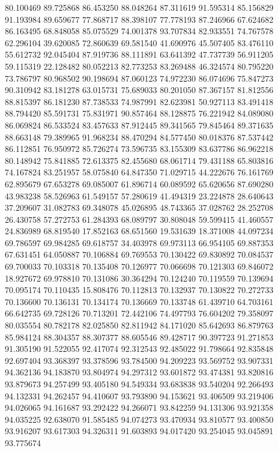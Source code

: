 80.100469
89.725868
86.453250
88.048264
87.311619
91.595314
85.156829
91.193984
89.659677
77.868717
88.398107
77.778193
87.246966
67.624682
86.163495
68.848058
85.075529
74.001378
93.707834
82.933551
74.767578
62.296104
39.620085
72.860639
69.581540
41.690976
45.507405
83.476110
55.612732
92.045404
87.919736
88.111891
63.641392
47.737739
56.911205
59.115319
22.128482
80.052213
82.773253
83.269488
46.324574
80.795220
73.786797
80.968502
90.198694
87.060123
74.972230
86.074696
75.847273
90.310942
83.181278
63.015731
75.689033
80.201050
87.367157
81.812556
88.815397
86.181230
87.738533
74.987991
82.623981
50.927113
83.491418
88.794420
85.591731
75.831971
90.857464
88.128875
76.221942
84.089080
86.069824
86.533524
83.457633
87.912445
89.341565
79.845464
89.371635
88.663148
79.389965
91.968234
88.470294
84.577450
80.018376
87.537442
86.112851
76.950972
85.726274
73.596735
83.155309
83.637786
86.962218
80.148942
75.841885
72.613375
82.455680
68.061714
79.431188
65.803816
74.167824
83.251957
58.075840
64.847350
71.029715
44.222676
76.161769
62.895679
67.653278
69.085007
61.896714
60.089592
65.620656
87.690280
43.983238
58.526963
61.549157
57.280619
41.494319
23.224878
28.640643
37.209607
31.082783
69.348078
45.026895
48.743365
37.028762
28.252708
26.430758
57.272753
61.284393
68.089797
30.808048
59.599415
41.460557
24.836989
68.819540
17.852163
68.651560
19.531639
18.371008
44.097234
69.786597
69.984285
69.618757
34.403978
69.973113
66.954105
69.887353
67.631451
64.050887
70.106884
69.769553
70.130422
69.830892
70.084537
69.700033
70.103318
70.135408
70.126977
70.066698
70.121303
69.846072
18.927672
69.978810
70.131086
30.364294
70.124240
70.119559
70.139694
70.095174
70.110435
15.808476
70.112813
70.132937
70.130822
70.272733
70.136600
70.136131
70.134174
70.136669
70.133748
61.439710
64.703161
66.642735
69.728126
70.713201
72.442106
74.497793
76.604202
79.358097
80.035554
80.782178
82.025850
82.811942
84.171020
85.642693
86.879763
85.984124
88.304357
88.307377
88.605546
89.428717
90.397723
91.271853
91.305190
91.522055
92.417074
92.312543
92.485022
91.798664
92.835848
92.697404
93.368397
93.378596
93.784500
94.209223
93.569752
93.907331
94.362136
94.183870
93.804974
94.297312
93.601872
93.474381
93.820816
93.879673
94.257499
93.405180
94.549334
93.683838
93.540204
92.266493
94.132331
94.262457
94.410607
93.793890
94.153621
93.406509
93.219406
94.026065
94.161687
93.292422
94.266071
93.842259
94.131306
93.921358
94.035225
92.638070
91.585485
94.074273
93.470934
93.810577
93.400850
93.916207
93.617303
94.326311
91.603893
94.017420
93.254045
93.045891
93.775674
